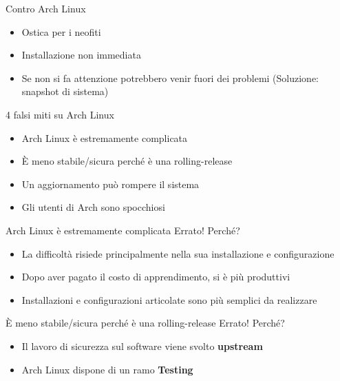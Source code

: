 
\begin{frame}{Contro Arch Linux}
    \begin{itemize}
        \item Ostica per i neofiti
        \item Installazione non immediata
        \item Se non si fa attenzione potrebbero venir fuori dei problemi (Soluzione: snapshot di sistema)
    \end{itemize}
\end{frame}


\begin{frame}{4 falsi miti su Arch Linux}
    \begin{itemize}
        \item Arch Linux è estremamente complicata
        \item È meno stabile/sicura perché è una rolling-release
        \item Un aggiornamento può rompere il sistema
        \item Gli utenti di Arch sono spocchiosi
    \end{itemize}
\end{frame}


\begin{frame}{Arch Linux è estremamente complicata}
    \alert{Errato!} Perché?
    \begin{itemize}
        \item La difficoltà risiede principalmente nella sua installazione e configurazione
        \item Dopo aver pagato il costo di apprendimento, si è più produttivi
        \item Installazioni e configurazioni articolate sono più semplici da realizzare
        
    \end{itemize}
\end{frame}


\begin{frame}{È meno stabile/sicura perché è una rolling-release}
    \alert{Errato!} Perché?
    \begin{itemize}
        \item Il lavoro di sicurezza sul software viene svolto \textbf{upstream}
        \item Arch Linux dispone di un ramo \textbf{Testing}
    \end{itemize}
\end{frame}

